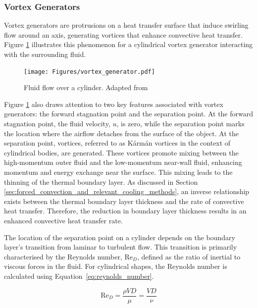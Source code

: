 \subsubsection{Vortex Generators}
Vortex generators are protrusions on a heat transfer surface that induce swirling flow around an axis, generating vortices that enhance convective heat transfer. \cite{Awais2018HeatActivities} Figure \ref{fig:vortex_generator} illustrates this phenomenon for a cylindrical vortex generator interacting with the surrounding fluid.

\begin{figure}[H]
    \centering
    \texttt{[image: Figures/vortex\_generator.pdf]}
    \caption{Fluid flow over a cylinder. Adapted from \cite{VanTreuren2015ABSTRACTTurbines}}
    \label{fig:vortex_generator}
\end{figure}

Figure \ref{fig:vortex_generator} also draws attention to two key features associated with vortex generators: the forward stagnation point and the separation point. At the forward stagnation point, the fluid velocity, $u$, is zero, while the separation point marks the location where the airflow detaches from the surface of the object. At the separation point, vortices, referred to as Kármán vortices in the context of cylindrical bodies, are generated. \cite{Wille1960KarmanStreets} These vortices promote mixing between the high-momentum outer fluid and the low-momentum near-wall fluid, enhancing momentum and energy exchange near the surface. This mixing leads to the thinning of the thermal boundary layer. As discussed in Section \ref{sec:forced_convection_and_relevant_cooling_methods}, an inverse relationship exists between the thermal boundary layer thickness and the rate of convective heat transfer. Therefore, the reduction in boundary layer thickness results in an enhanced convective heat transfer rate.

The location of the separation point on a cylinder depends on the boundary layer’s transition from laminar to turbulent flow. This transition is primarily characterised by the Reynolds number, \(\text{Re}_D\), defined as the ratio of inertial to viscous forces in the fluid. For cylindrical shapes, the Reynolds number is calculated using Equation~\ref{eq:reynolds_number}. \cite{Cengel2014ExternalConvection}

\begin{equation}
    \text{Re}_D = \frac{\rho V D}{\mu} = \frac{V D}{\nu}
    \label{eq:reynolds_number}
\end{equation}

